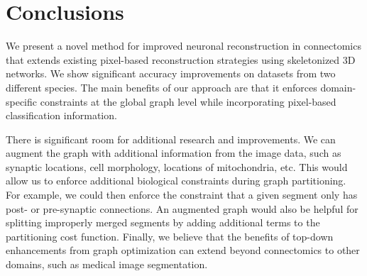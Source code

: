 \section{Conclusions}

We present a novel method for improved neuronal reconstruction in connectomics that extends existing pixel-based reconstruction strategies using skeletonized 3D networks. We show significant accuracy improvements on datasets from two different species. The main benefits of our approach are that it enforces domain-specific constraints at the global graph level while incorporating pixel-based classification information.

There is significant room for additional research and improvements. We can augment the graph with additional information from the image data, such as synaptic locations, cell morphology, locations of mitochondria, etc. This would allow us to enforce additional biological constraints during graph partitioning. For example, we could then enforce the constraint that a given segment only has post- or pre-synaptic connections. An augmented graph would also be helpful for splitting improperly merged segments by adding additional terms to the partitioning cost function. Finally, we believe that the benefits of top-down enhancements from graph optimization can extend beyond connectomics to other domains, such as medical image segmentation.
